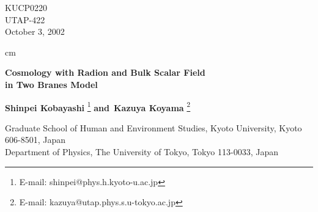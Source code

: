 \documentclass[a4paper,11pt]{article}
\begin{document}
\baselineskip 0.8cm
\thispagestyle{empty}
\begin{flushright}
KUCP0220\\
UTAP-422\\
October 3, 2002\\ 
\end{flushright}
 cm
\begin{center}
{\LARGE \bf Cosmology with Radion and Bulk Scalar Field} \\
{\LARGE \bf in Two Branes Model}
\vskip 1.7cm

{\bf Shinpei Kobayashi}
\footnote{E-mail: shinpei@phys.h.kyoto-u.ac.jp}
{\bf and}\ 
{\bf Kazuya Koyama}
\footnote{E-mail: kazuya@utap.phys.s.u-tokyo.ac.jp}\

\vskip 1.5mm

\vskip 2cm
 \coordHE{} Graduate School of Human and Environment Studies, Kyoto
University, Kyoto  606-8501, Japan \\
 \coordHE{} Department of Physics, The University of Tokyo, Tokyo 113-0033, 
     Japan 
\end{center}

\newpage
\end{document}
